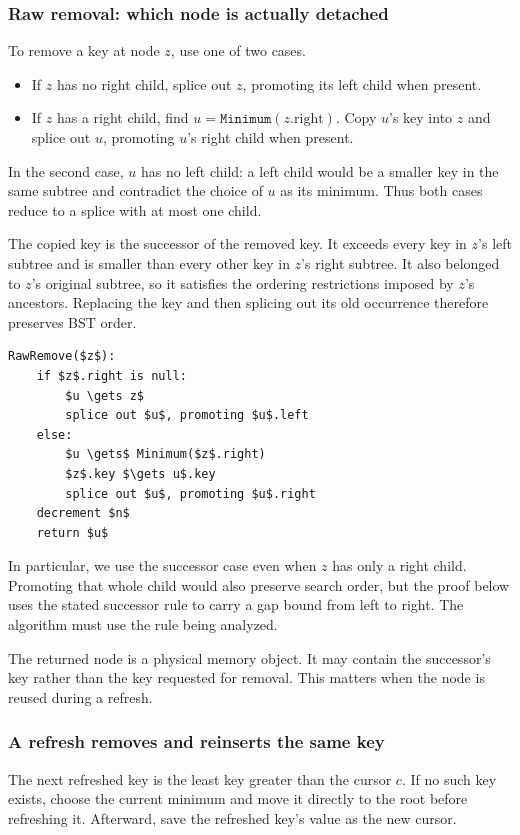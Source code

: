 \documentclass[11pt,a4paper]{article}
\theoremstyle{readable}
\newcommand{\code}[1]{\texttt{#1}}
\begin{document}
\subsubsection*{Raw removal: which node is actually detached}
To remove a key at node $z$, use one of two cases.
\begin{itemize}
  \item If $z$ has no right child, splice out $z$, promoting its left
        child when present.
  \item If $z$ has a right child, find $u=\code{Minimum}(z.\mathrm{right})$.
        Copy $u$'s key into $z$ and splice out $u$, promoting $u$'s
        right child when present.
\end{itemize}
In the second case, $u$ has no left child: a left child would be a
smaller key in the same subtree and contradict the choice of $u$ as
its minimum. Thus both cases reduce to a splice with at most one child.

The copied key is the successor of the removed key. It exceeds every
key in $z$'s left subtree and is smaller than every other key in $z$'s
right subtree. It also belonged to $z$'s original subtree, so it satisfies
the ordering restrictions imposed by $z$'s ancestors. Replacing the key
and then splicing out its old occurrence therefore preserves BST order.

\noindent\begin{minipage}{\linewidth}
\begin{lstlisting}[caption={Raw removal returns a detached node for reuse.}]
RawRemove($z$):
    if $z$.right is null:
        $u \gets z$
        splice out $u$, promoting $u$.left
    else:
        $u \gets$ Minimum($z$.right)
        $z$.key $\gets u$.key
        splice out $u$, promoting $u$.right
    decrement $n$
    return $u$
\end{lstlisting}
\end{minipage}

In particular, we use the successor case even when $z$ has only a
right child. Promoting that whole child would also preserve search
order, but the proof below uses the stated successor rule to carry a
gap bound from left to right. The algorithm must use the rule being
analyzed.

The returned node is a physical memory object. It may contain the
successor's key rather than the key requested for removal. This matters
when the node is reused during a refresh.

\subsubsection*{A refresh removes and reinserts the same key}
The next refreshed key is the least key greater than the cursor $c$.
If no such key exists, choose the current minimum and move it directly
to the root before refreshing it. Afterward, save the refreshed key's
value as the new cursor.
\end{document}
